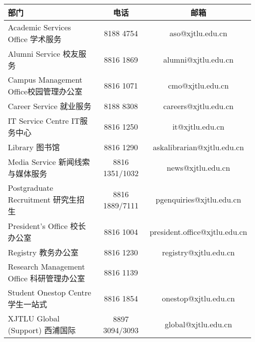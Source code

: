 \begin{table}[H]
    \begin{tabular}{p{60mm}cc}
        \hline
        部门 & 电话 & 邮箱 \\ \hline
        Academic Services Office \newline 学术服务 & 8188 4754 & aso@xjtlu.edu.cn \\ \hline
        Alumni Service \newline 校友服务           & 8816 1869 & alumni@xjtlu.edu.cn \\ \hline
        Campus Management Office\newline 校园管理办公室 & 8816 1071 & cmo@xjtlu.edu.cn \\ \hline
        Career Service \newline 就业服务           & 8188 8308 & careers@xjtlu.edu.cn \\ \hline
        IT Service Centre \newline IT服务中心      & 8816 1250 & it@xjtlu.edu.cn \\ \hline
        Library \newline 图书馆                    & 8816 1290 & askalibrarian@xjtlu.edu.cn \\ \hline
        Media Service \newline 新闻线索与媒体服务    & 8816 1351/1032 & news@xjtlu.edu.cn \\ \hline
        Postgraduate Recruitment \newline 研究生招生 & 8816 1889/7111 & pgenquiries@xjtlu.edu.cn \\ \hline
        President's Office \newline 校长办公室     & 8816 1004 & president.office@xjtlu.edu.cn \\ \hline
        Registry \newline 教务办公室               & 8816 1230 & registry@xjtlu.edu.cn \\ \hline
        Research Management Office \newline 科研管理办公室 & 8816 1139 &  \\ \hline
        Student Onestop Centre \newline 学生一站式 & 8816 1854 & onestop@xjtlu.edu.cn \\ \hline
        XJTLU Global (Support) \newline 西浦国际 & 8897 3094/3093 & global@xjtlu.edu.cn \\ \hline
    \end{tabular}
\end{table}
\clearpage

